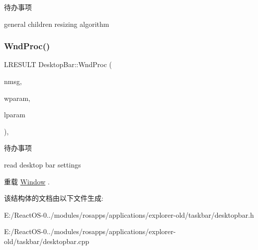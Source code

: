 \begin{DoxyRefDesc}{待办事项}
\item[\hyperlink{todo__todo000054}{待办事项}]general children resizing algorithm \end{DoxyRefDesc}
\mbox{\label{struct_desktop_bar_ada798df262ee57ae2d3e9f8a3ee38d0d}} 
\subsubsection{\texorpdfstring{Wnd\+Proc()}{WndProc()}}
{\footnotesize\ttfamily L\+R\+E\+S\+U\+LT Desktop\+Bar\+::\+Wnd\+Proc (\begin{DoxyParamCaption}\item[{U\+I\+NT}]{nmsg,  }\item[{W\+P\+A\+R\+AM}]{wparam,  }\item[{L\+P\+A\+R\+AM}]{lparam }\end{DoxyParamCaption})\hspace{0.3cm}{\ttfamily [protected]}, {\ttfamily [virtual]}}

\begin{DoxyRefDesc}{待办事项}
\item[\hyperlink{todo__todo000053}{待办事项}]read desktop bar settings \end{DoxyRefDesc}


重载 \hyperlink{struct_window}{Window} .



该结构体的文档由以下文件生成\+:\begin{DoxyCompactItemize}
\item 
E\+:/\+React\+O\+S-\/0../modules/rosapps/applications/explorer-\/old/taskbar/desktopbar.\+h\item 
E\+:/\+React\+O\+S-\/0../modules/rosapps/applications/explorer-\/old/taskbar/desktopbar.\+cpp\end{DoxyCompactItemize}
